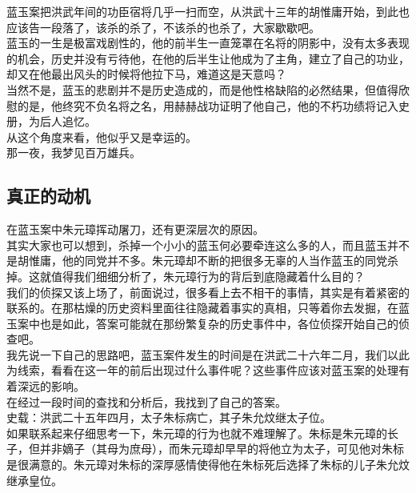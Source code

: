 \begin{multicols}{\theparacolNo}
蓝玉案把洪武年间的功臣宿将几乎一扫而空，从洪武十三年的胡惟庸开始，到此也应该告一段落了，该杀的杀了，不该杀的也杀了，大家歇歇吧。\\

蓝玉的一生是极富戏剧性的，他的前半生一直笼罩在名将的阴影中，没有太多表现的机会，历史并没有亏待他，在他的后半生让他成为了主角，建立了自己的功业，却又在他最出风头的时候将他拉下马，难道这是天意吗？\\

当然不是，蓝玉的悲剧并不是历史造成的，而是他性格缺陷的必然结果，但值得欣慰的是，他终究不负名将之名，用赫赫战功证明了他自己，他的不朽功绩将记入史册，为后人追忆。\\

从这个角度来看，他似乎又是幸运的。\\

那一夜，我梦见百万雄兵。\\

\subsection{真正的动机}
在蓝玉案中朱元璋挥动屠刀，还有更深层次的原因。\\

其实大家也可以想到，杀掉一个小小的蓝玉何必要牵连这么多的人，而且蓝玉并不是胡惟庸，他的同党并不多。朱元璋却不断的把很多无辜的人当作蓝玉的同党杀掉。这就值得我们细细分析了，朱元璋行为的背后到底隐藏着什么目的？\\

我们的侦探又该上场了，前面说过，很多看上去不相干的事情，其实是有着紧密的联系的。在那枯燥的历史资料里面往往隐藏着事实的真相，只等着你去发掘，在蓝玉案中也是如此，答案可能就在那纷繁复杂的历史事件中，各位侦探开始自己的侦查吧。\\

我先说一下自己的思路吧，蓝玉案件发生的时间是在洪武二十六年二月，我们以此为线索，看看在这一年的前后出现过什么事件呢？这些事件应该对蓝玉案的处理有着深远的影响。\\

在经过一段时间的查找和分析后，我找到了自己的答案。\\

史载：洪武二十五年四月，太子朱标病亡，其子朱允炆继太子位。\\

如果联系起来仔细思考一下，朱元璋的行为也就不难理解了。朱标是朱元璋的长子，但并非嫡子（其母为庶母），而朱元璋却早早的将他立为太子，可见他对朱标是很满意的。朱元璋对朱标的深厚感情使得他在朱标死后选择了朱标的儿子朱允炆继承皇位。\\


\end{multicols}
